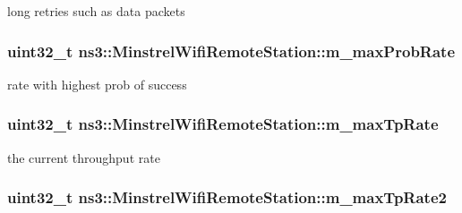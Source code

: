 long retries such as data packets 

\subsubsection[{\texorpdfstring{m\+\_\+max\+Prob\+Rate}{m_maxProbRate}}]{\setlength{\rightskip}{0pt plus 5cm}uint32\+\_\+t ns3\+::\+Minstrel\+Wifi\+Remote\+Station\+::m\+\_\+max\+Prob\+Rate}\hypertarget{structns3_1_1MinstrelWifiRemoteStation_a77ab2136ac37d866eee59325508a19d3}{}\label{structns3_1_1MinstrelWifiRemoteStation_a77ab2136ac37d866eee59325508a19d3}


rate with highest prob of success 

\subsubsection[{\texorpdfstring{m\+\_\+max\+Tp\+Rate}{m_maxTpRate}}]{\setlength{\rightskip}{0pt plus 5cm}uint32\+\_\+t ns3\+::\+Minstrel\+Wifi\+Remote\+Station\+::m\+\_\+max\+Tp\+Rate}\hypertarget{structns3_1_1MinstrelWifiRemoteStation_aee7f3d4355ae3b93e92b571786186bce}{}\label{structns3_1_1MinstrelWifiRemoteStation_aee7f3d4355ae3b93e92b571786186bce}


the current throughput rate 

\subsubsection[{\texorpdfstring{m\+\_\+max\+Tp\+Rate2}{m_maxTpRate2}}]{\setlength{\rightskip}{0pt plus 5cm}uint32\+\_\+t ns3\+::\+Minstrel\+Wifi\+Remote\+Station\+::m\+\_\+max\+Tp\+Rate2}\hypertarget{structns3_1_1MinstrelWifiRemoteStation_a2fc005b37f4b1ed2442b06288cc19aff}{}\label{structns3_1_1MinstrelWifiRemoteStation_a2fc005b37f4b1ed2442b06288cc19aff}


